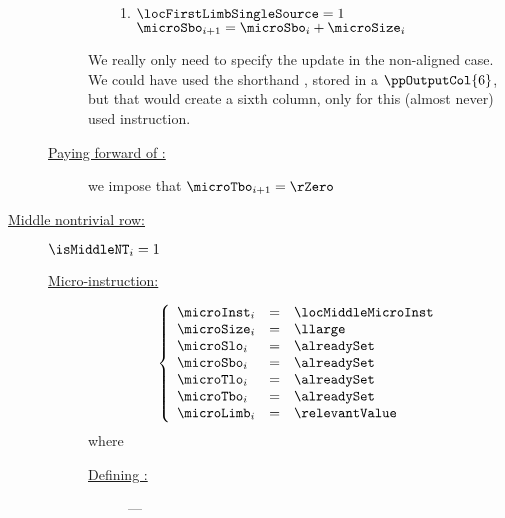 \begin{description}
\begin{description}
\begin{enumerate}
\begin{enumerate}
							\item \If $\locFirstLimbSingleSource = 1$ \Then $\microSbo_{i + 1} = \microSbo_{i} + \microSize_{i}$
						\end{enumerate}
				\end{enumerate}
				\saNote{} We really only need to specify the \microSbo{} update in the non-aligned case.
				\saNote{} We could have used the shorthand \locMiddleSbo, stored in a $\ppOutputCol{6}$, but that would create a sixth column, only for this (almost never) used instruction. 
			\item[\underline{Paying forward of \microTbo{}:}]
				we impose that $\microTbo_{i + 1} = \rZero$
		\end{description}
	\item[\underline{Middle nontrivial row:}] 
		\If $\isMiddleNT_{i} = 1$ \Then
		\begin{description}
			\item[\underline{Micro-instruction:}]
				\[
					\left\{ \begin{array}{lcl}
						\microInst        _{i} & = & \locMiddleMicroInst     \\
						\microSize        _{i} & = & \llarge                 \\
						\microSlo         _{i} & = & \alreadySet             \\
						\microSbo         _{i} & = & \alreadySet             \\
						\microTlo         _{i} & = & \alreadySet             \\
						\microTbo         _{i} & = & \alreadySet             \\
						\microLimb        _{i} & = & \relevantValue          \\
					\end{array} \right.
				\]
				where
				\begin{description}
					\item[\underline{Defining \locMiddleMicroInst:}] ---

\end{description}
\end{description}
\end{description}
